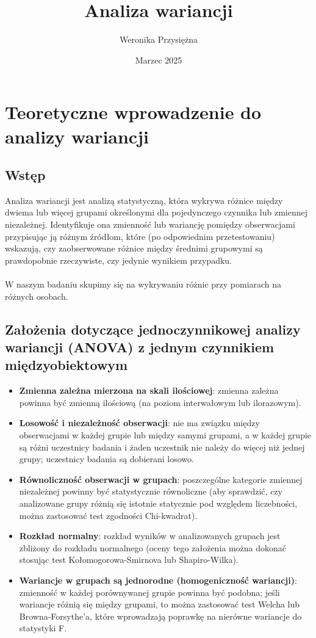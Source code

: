 \documentclass{article}
\title{Analiza wariancji}
\author{Weronika Przysiężna}
\date{Marzec 2025}
\begin{document}
\maketitle
\newpage
\section{Teoretyczne wprowadzenie do analizy wariancji}

\subsection{Wstęp}
Analiza wariancji jest analizą statystyczną, która wykrywa różnice między dwiema lub więcej grupami określonymi dla pojedynczego czynnika lub zmiennej niezależnej. Identyfikuje ona zmienność lub wariancję pomiędzy obserwacjami przypisując ją różnym źródłom, które (po odpowiednim przetestowaniu) wskazują, czy zaobserwowane różnice między średnimi grupowymi są prawdopobnie rzeczywiste, czy jedynie wynikiem przypadku. \cite{witte2010statistics}\\
\\W naszym badaniu skupimy się na wykrywaniu różnic przy pomiarach na różnych osobach.

\subsection{Założenia dotyczące jednoczynnikowej analizy wariancji (ANOVA) z jednym czynnikiem międzyobiektowym}

\begin{itemize}
    \item \textbf{Zmienna zależna mierzona na skali ilościowej}: zmienna zależna powinna być zmienną ilościową (na poziom interwałowym lub ilorazowym).
    \item \textbf{Losowość i niezależność obserwacji}: nie ma związku między obserwacjami w każdej grupie lub między samymi grupami, a w każdej grupie są różni uczestnicy badania i żaden uczestnik nie należy do więcej niż jednej grupy;  uczestnicy badania są dobierani losowo.
    \item \textbf{Równoliczność obserwacji w grupach}: poszczególne kategorie zmiennej niezależnej powinny być statystycznie równoliczne (aby sprawdzić, czy analizowane grupy różnią się istotnie statycznie pod względem liczebności, można zastosować test zgodności Chi-kwadrat).
    \item \textbf{Rozkład normalny}: rozkład wyników w analizowanych grupach jest zbliżony do rozkładu normalnego (oceny tego założenia można dokonać stosując test Kołomogorowa-Smirnova lub Shapiro-Wilka).
    \item \textbf{Wariancje w grupach są jednorodne (homogeniczność wariancji)}: zmienność w każdej porównywanej grupie powinna być podobna; jeśli wariancje różnią się między grupami, to można zastosować test Welcha lub Browna-Forsythe'a, które wprowadzają poprawkę na nierówne wariancje do statystyki F.

\end{itemize}
\end{document}
